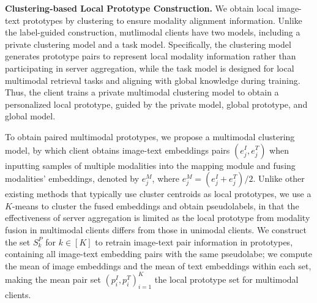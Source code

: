 \noindent\textbf{Clustering-based Local Prototype Construction. }\label{sec:ulpc}
We obtain local image-text prototypes by clustering to ensure modality alignment information. 
Unlike the label-guided construction, mutlimodal clients have two models, including a private clustering model and a task model. 
Specifically, the clustering model generates prototype pairs to represent local modality information rather than participating in server aggregation, while the task model is designed for local multimodal retrieval tasks and aligning with global knowledge during training. 
Thus, the client trains a private multimodal clustering model to obtain a personalized local prototype, guided by the private model, global prototype, and global model.


To obtain paired multimodal prototypes, we propose a multimodal clustering model, by which client obtains image-text embeddings pairs $(e_j^I,e_j^T)$ when inputting samples of multiple modalities into the mapping module and fusing modalities' embeddings, denoted by $e_j^M$, where $e_j^M={(e_j^I+e_j^T)}/{2}$. 
Unlike other existing methods that typically use cluster centroids as local prototypes, we use a $K$-means to cluster the fused embeddings and obtain pseudolabels, in that the effectiveness of server aggregation is limited as the local prototype from modality fusion in multimodal clients differs from those in unimodal clients.  
We construct the set $S_k^P$ for $k \in [K]$ to retrain image-text pair information in prototypes, containing all image-text embedding pairs with the same pseudolabe; we compute the mean of image embeddings and the mean of text embeddings within each set, making the mean pair set ${(p_i^I, p_i^T)}_{i=1}^{K}$ the local prototype set for multimodal clients.

